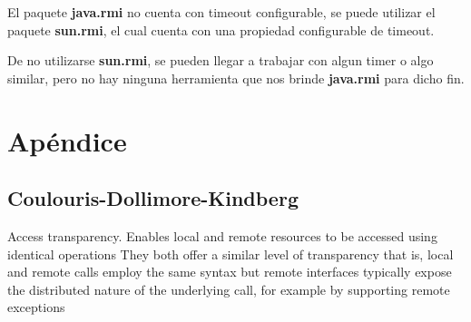\documentclass[osajnl,twocolumn,showpacs,superscriptaddress,10pt]{revtex4-1} %
\begin{document}
El paquete \textbf{java.rmi} no cuenta con timeout configurable,
se puede utilizar el paquete \textbf{sun.rmi}, el cual cuenta con una
propiedad configurable de timeout.

De no utilizarse \textbf{sun.rmi}, se pueden llegar a trabajar con algun
timer o algo similar, pero no hay ninguna herramienta que nos brinde 
\textbf{java.rmi} para dicho fin.

\section{Apéndice}

\subsection{Coulouris-Dollimore-Kindberg}
\label{apendix:1a}

Access transparency. Enables local and remote resources to be
accessed using identical operations They both offer a similar level
of transparency that is, local and remote calls employ the same
syntax but remote interfaces typically expose the distributed nature
of the underlying call, for example by supporting remote exceptions
\end{document}
